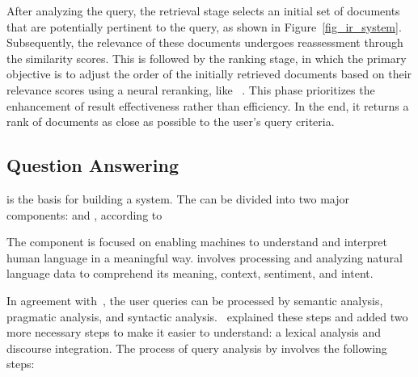 After analyzing the query, the retrieval stage selects an initial set of documents that are potentially pertinent to the query, as shown in Figure~\ref{fig_ir_system}. Subsequently, the relevance of these documents undergoes reassessment through the similarity scores. This is followed by the ranking stage, in which the primary objective is to adjust the order of the initially retrieved documents based on their relevance scores using a neural reranking, like {\bert}~\cite{chen_integrating_2023}. This phase prioritizes the enhancement of result effectiveness rather than efficiency. In the end, it returns a rank of documents as close as possible to the user's query criteria. 


\subsection{Question Answering}

{\nlp} is the basis for building a {\qa} system. The {\nlp} can be divided into two major components: {\nlu} and {\nlg}, according to~\citet{ayanouz_smart_2020}

The \textbf{{\nlu}} component is focused on enabling machines to understand and interpret human language in a meaningful way. {\nlu} involves processing and analyzing natural language data to comprehend its meaning, context, sentiment, and intent. 

In agreement with~\citet{ngai_intelligent_2021}, the user queries can be processed by semantic analysis, pragmatic analysis, and syntactic analysis.~\citet{ayanouz_smart_2020} explained these steps and added two more necessary steps to make it easier to understand: a lexical analysis and discourse integration. The process of query analysis by {\nlu} involves the following steps:

